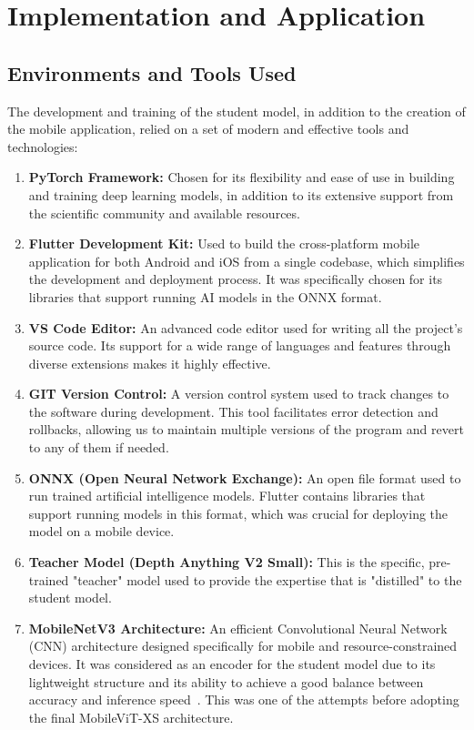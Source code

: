 \chapter{Implementation and Application}
\label{chap:implementation}

\section{Environments and Tools Used}
\label{sec:tools}

The development and training of the student model, in addition to the creation of the mobile application, relied on a set of modern and effective tools and technologies:

\begin{enumerate}
    \item \textbf{PyTorch Framework:} Chosen for its flexibility and ease of use in building and training deep learning models, in addition to its extensive support from the scientific community and available resources.
    \item \textbf{Flutter Development Kit:} Used to build the cross-platform mobile application for both Android and iOS from a single codebase, which simplifies the development and deployment process. It was specifically chosen for its libraries that support running AI models in the ONNX format.
    \item \textbf{VS Code Editor:} An advanced code editor used for writing all the project's source code. Its support for a wide range of languages and features through diverse extensions makes it highly effective.
    \item \textbf{GIT Version Control:} A version control system used to track changes to the software during development. This tool facilitates error detection and rollbacks, allowing us to maintain multiple versions of the program and revert to any of them if needed.
    \item \textbf{ONNX (Open Neural Network Exchange):} An open file format used to run trained artificial intelligence models. Flutter contains libraries that support running models in this format, which was crucial for deploying the model on a mobile device.
    \item \textbf{Teacher Model (Depth Anything V2 Small):} This is the specific, pre-trained "teacher" model used to provide the expertise that is "distilled" to the student model.
    \item \textbf{MobileNetV3 Architecture:} An efficient Convolutional Neural Network (CNN) architecture designed specifically for mobile and resource-constrained devices. It was considered as an encoder for the student model due to its lightweight structure and its ability to achieve a good balance between accuracy and inference speed~\cite{koonce2021mobilenetv3}. This was one of the attempts before adopting the final MobileViT-XS architecture.

\end{enumerate}
